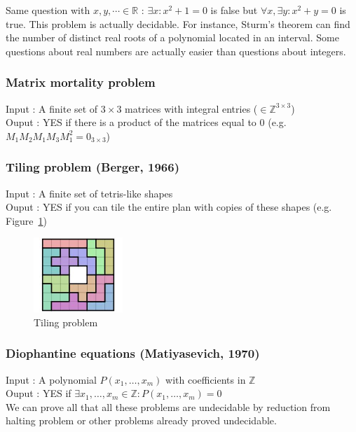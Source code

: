 Same question with $x,y,\cdots \in \mathbb{R}$ :  $\exists x : x^2+1=0$ is false but  $\forall x, \exists y : x^2+y=0$ is true. This problem is actually decidable. For instance, Sturm's theorem can find the number of distinct real roots of a polynomial located in an interval. Some questions about real numbers are actually easier than questions about integers.

\subsubsection{Matrix mortality problem}
Input : A finite set of $3\times3$ matrices with integral entries ($\in \mathbb{Z}^{3\times3}$)\\
Ouput : YES if there is a product of the matrices equal to $0$ (e.g. $M_1M_2M_1M_3M_1^2 = 0_{3\times3}$)

\subsubsection{Tiling problem (Berger, 1966)}
Input : A finite set of tetris-like shapes \\
Ouput : YES if you can tile the entire plan with copies of these shapes (e.g. Figure~\ref{Tiling})
\begin{figure}[!h]
                 \centering\includegraphics[width=0.3\textwidth]{images/pentomio.png}
         	\caption{Tiling problem}
        		\label{Tiling}
\end{figure}

\subsubsection{Diophantine equations (Matiyasevich, 1970)}
Input : A polynomial $P(x_1,\ldots, x_m)$ with coefficients in $\mathbb{Z}$ \\
Ouput : YES if $\exists x_1,\ldots, x_m \in \mathbb{Z} : P(x_1,\ldots, x_m) = 0$ \\

We can prove all that all these problems are undecidable by reduction from halting problem or other problems already proved undecidable.